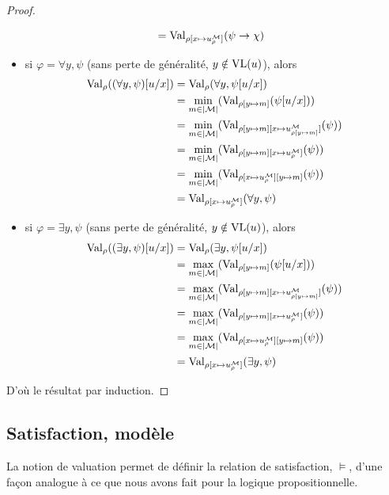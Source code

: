 \begin{proof}
\begin{itemize}
\begin{align*}
      &= \operatorname{Val}_{\rho[x\mapsto u^\mathcal M_\rho]}(\psi\to \chi)
    \end{align*}
  \item si $\varphi = \forall y, \psi$ (sans perte de généralité,
    $y\notin \operatorname{VL}(u)$), alors
    \begin{align*}
      \operatorname{Val}_\rho((\forall y,\psi)[u/x]) &= \operatorname{Val}_\rho(\forall y,\psi[u/x])\\
      &= \min_{m\in|\mathcal M|}(\operatorname{Val}_{\rho[y \mapsto m]}(\psi[u/x]))\\
      &= \min_{m\in|\mathcal M|}(\operatorname{Val}_{\rho[y\mapsto m]
        [x\mapsto u^\mathcal M_{\rho[y\mapsto m]}]}(\psi))\\
      &= \min_{m\in|\mathcal M|}(\operatorname{Val}_{\rho[y\mapsto m][x\mapsto u^\mathcal M_\rho]}(\psi))\\
      &= \min_{m\in|\mathcal M|}(\operatorname{Val}_{\rho[x\mapsto u^\mathcal M_\rho][y\mapsto m]}(\psi))\\
      &= \operatorname{Val}_{\rho[x\mapsto u^\mathcal M_\rho]}(\forall y, \psi)
    \end{align*}
  \item si $\varphi = \exists y, \psi$ (sans perte de généralité,
    $y\notin \operatorname{VL}(u)$), alors
    \begin{align*}
      \operatorname{Val}_\rho((\exists y,\psi)[u/x]) &= \operatorname{Val}_\rho(\exists y,\psi[u/x])\\
      &= \max_{m\in|\mathcal M|}(\operatorname{Val}_{\rho[y \mapsto m]}(\psi[u/x]))\\
      &= \max_{m\in|\mathcal M|}(\operatorname{Val}_{\rho[y\mapsto m]
        [x\mapsto u^\mathcal M_{\rho[y\mapsto m]}]}(\psi))\\
      &= \max_{m\in|\mathcal M|}(\operatorname{Val}_{\rho[y\mapsto m][x\mapsto u^\mathcal M_\rho]}(\psi))\\
      &= \max_{m\in|\mathcal M|}(\operatorname{Val}_{\rho[x\mapsto u^\mathcal M_\rho][y\mapsto m]}(\psi))\\
      &= \operatorname{Val}_{\rho[x\mapsto u^\mathcal M_\rho]}(\exists y, \psi)
    \end{align*}
  \end{itemize}
  D'où le résultat par induction.
\end{proof}

\subsection{Satisfaction, modèle}

La notion de valuation permet de définir la relation de satisfaction, $\models$,
d'une façon analogue à ce que nous avons fait pour la logique propositionnelle.

